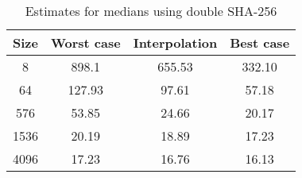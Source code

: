 \begin{table}
  \centering
  \caption{Estimates for medians using double \ac{SHA}-256}
  \begin{tabular}{ | c | c | c | c |}
    \hline
    \textbf{Size} & \textbf{Worst case} & \textbf{Interpolation} & \textbf{Best case} \\ \hline
    8    & 898.1  & 655.53  & 332.10 \\ \hline
    64   & 127.93 & 97.61  & 57.18 \\ \hline
    576  & 53.85  & 24.66  & 20.17 \\ \hline
    1536 & 20.19  & 18.89  & 17.23 \\ \hline
    4096 & 17.23  & 16.76  & 16.13 \\ \hline
  \end{tabular}
  \label{tbl:supercop:sha256d}
\end{table}
